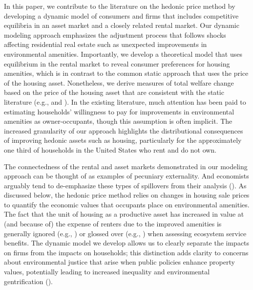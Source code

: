 \documentclass[ecta,nameyear,draft]{econsocart}
\theoremstyle{plain}
\theoremstyle{remark}
\begin{document}
In this paper, we contribute to the literature on the hedonic price method by developing a dynamic model of consumers and firms that includes competitive equilibria in an asset market and a closely related rental market. Our dynamic modeling approach emphasizes the adjustment process that follows shocks affecting residential real estate such as unexpected improvements in environmental amenities. Importantly, we develop a theoretical model that uses equilibrium in the rental market to reveal consumer preferences for housing amenities, which is in contrast to the common static approach that uses the price of the housing asset. Nonetheless, we derive measures of total welfare change based on the price of the housing asset that are consistent with the static literature (e.g., \cite{freeman99} and \cite{freeman14}). In the existing literature, much attention has been paid to estimating households' willingness to pay for improvements in environmental amenities as owner-occupants, though this assumption is often implicit. The increased granularity of our approach highlights the distributional consequences of improving hedonic assets such as housing, particularly for the approximately one third of households in the United States who rent and do not own. 

The connectedness of the rental and asset markets demonstrated in our modeling approach can be thought of as examples of pecuniary externality. And economists arguably tend to de-emphasize these types of spillovers from their analysis (\cite{holcombe01}). As discussed below, the hedonic price method relies on changes in housing sale prices to quantify the economic values that occupants place on environmental amenities. The fact that the unit of housing as a productive asset has increased in value at (and because of) the expense of renters due to the improved amenities is generally ignored (e.g., \cite{bishop20}) or glossed over (e.g., \cite{banzhaf20}) when assessing ecosystem service benefits. The dynamic model we develop allows us to clearly separate the impacts on firms from the impacts on households; this distinction adds clarity to concerns about environmental justice that arise when public policies enhance property values, potentially leading to increased inequality and environmental gentrification (\cite{banzhaf19}). 
\end{document}
